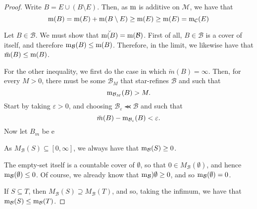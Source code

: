 \begin{thm}
\begin{savenotes}
\begin{proof}
Write $B=E\cup (B\setminus E)$.  Then, as $\mathrm{m}$ is additive on $\mathcal{M}$, we have that
\begin{equation}
\mathrm{m} (B)=\mathrm{m} (E)+\mathrm{m} (B\setminus E)\geq \mathrm{m} (E)\geq \mathrm{m} (E)=\mathrm{m} _{\mathcal{C}}(E)
\end{equation}

Let $B\in \mathcal{B}$.  We must show that $\breve{\mathrm{m} (B)}=\mathrm{m}(\mathcal{B})$.  First of all, $B\in \mathcal{B}$ is a cover of itself, and therefore $\mathrm{m} _{\mathcal{B}}(B)\leq \mathrm{m} (B)$.  Therefore, in the limit, we likewise have that $\breve{\mathrm{m}}(B)\leq \mathrm{m} (B)$.

For the other inequality, we first do the case in which $\breve{m}(B)=\infty$.  Then, for every $M>0$, there must be some $\mathcal{B}_M$ that star-refines $\mathcal{B}$ and such that
\begin{equation}
\mathrm{m} _{\mathcal{B}_M}(B)>M.
\end{equation}
Start by taking $\varepsilon >0$, and choosing $\mathcal{B}_{\varepsilon}\llcurly \mathcal{B}$ and such that
\begin{equation}
\breve{m}(B)-\mathrm{m} _{\mathcal{B}_{\varepsilon }}(B)<\varepsilon .
\end{equation}
Now let $B_m$ be e

As $M_{\mathcal{B}}(S)\subseteq [0,\infty ]$, we always have that $\mathrm{m} _{\mathcal{B}}(S)\geq 0$.

The empty-set itself is a countable cover of $\emptyset$, so that $0\in M_{\mathcal{B}}(\emptyset )$, and hence $\mathrm{m} _{\mathcal{B}}(\emptyset )\leq 0$.  Of course, we already know that $\mathrm{m} _{\mathcal{B}})\emptyset \geq 0$, and so $\mathrm{m} _{\mathcal{B}}(\emptyset )=0$.

If $S\subseteq T$, then $M_{\mathcal{B}}(S)\supseteq M_{\mathcal{B}}(T)$, and so, taking the infimum, we have that $\mathrm{m} _{\mathcal{B}}(S)\leq \mathrm{m} _{\mathcal{B}}(T)$.


\end{proof}
\end{savenotes}
\end{thm}

